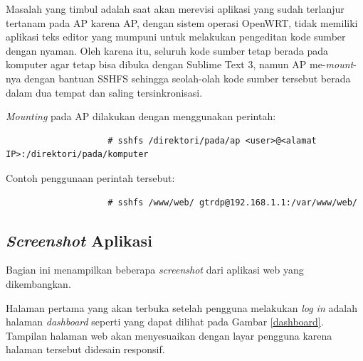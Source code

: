 			Masalah yang timbul adalah saat akan merevisi aplikasi yang sudah terlanjur tertanam pada AP karena AP, dengan sistem operasi OpenWRT, tidak memiliki aplikasi teks editor yang mumpuni untuk melakukan pengeditan kode sumber dengan nyaman. Oleh karena itu, seluruh kode sumber tetap berada pada komputer agar tetap bisa dibuka dengan Sublime Text 3, namun AP me-\emph{mount}-nya dengan bantuan SSHFS sehingga seolah-olah kode sumber tersebut berada dalam dua tempat dan saling tersinkronisasi.

			\emph{Mounting} pada AP dilakukan dengan menggunakan perintah:
			\begingroup
			    \fontsize{10pt}{12pt}\selectfont
			    \begin{verbatim}
					# sshfs /direktori/pada/ap <user>@<alamat IP>:/direktori/pada/komputer
			    \end{verbatim}  
			\endgroup

			Contoh penggunaan perintah tersebut:
			\begingroup
			    \fontsize{10pt}{12pt}\selectfont
			    \begin{verbatim}
					# sshfs /www/web/ gtrdp@192.168.1.1:/var/www/web/
			    \end{verbatim}  
			\endgroup
			

		\subsection{\emph{Screenshot} Aplikasi}
			Bagian ini menampilkan beberapa \emph{screenshot} dari aplikasi web yang dikembangkan.

			Halaman pertama yang akan terbuka setelah pengguna melakukan \emph{log in} adalah halaman \emph{dashboard} seperti yang dapat dilihat pada Gambar \ref{dashboard}. Tampilan halaman web akan menyesuaikan dengan layar pengguna karena halaman tersebut didesain responsif.

